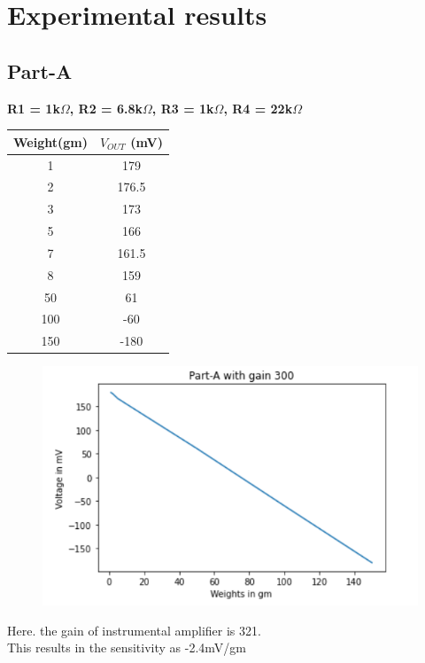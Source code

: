 \documentclass[12pt]{article}
\begin{document}
\section{Experimental results}
\subsection{Part-A}
\begin{center}
\textbf{R1 = 1k$\Omega $, R2 = 6.8k$\Omega $, R3 = 1k$\Omega $, R4 = 22k$\Omega $}
\end{center}
\begin{center}
\begin{table}[H]
		\begin{center}
		
		\begin{tabular}{|c|c|}
			\hline
			\textbf{Weight(gm)} & \textbf{$V_{OUT}$ (mV)}\\
			\hline
			1 & 179\\
			\hline
			2 & 176.5\\
			\hline
                   3 & 173\\
			\hline
                   5 & 166\\
			\hline
                   7 & 161.5\\
			\hline
                   8 & 159\\
			\hline
50 & 61\\
			\hline
100 & -60\\
			\hline
150 & -180\\
			\hline
            
		\end{tabular}
		\end{center}
\end{table}
\end{center}
\begin{figure}[H]
\begin{center}
\includegraphics[scale = 1]{ai.PNG}
\end{center}
\end{figure}
Here. the gain of instrumental amplifier is 321.\\
This results in the sensitivity as -2.4mV/gm\\
\end{document}
